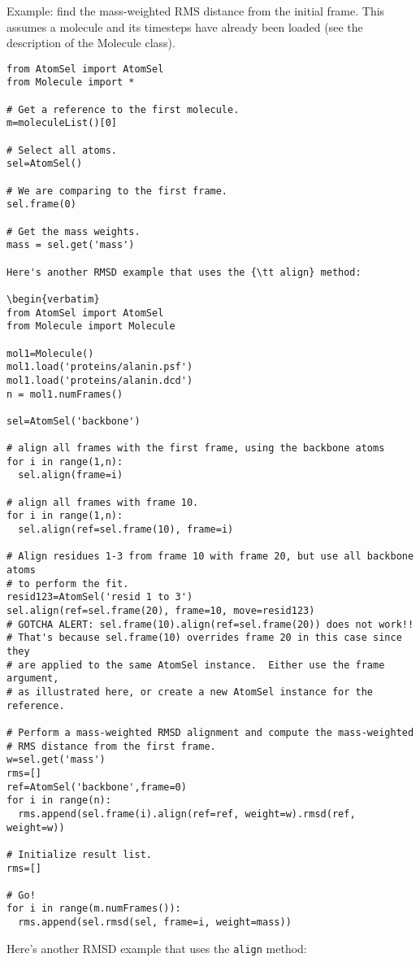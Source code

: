 Example: find the mass-weighted RMS distance from the initial frame.
This assumes a molecule and its timesteps have already been loaded
(see the description of the Molecule class).

\begin{verbatim}
from AtomSel import AtomSel
from Molecule import *

# Get a reference to the first molecule.
m=moleculeList()[0]

# Select all atoms.
sel=AtomSel()

# We are comparing to the first frame.
sel.frame(0)

# Get the mass weights.
mass = sel.get('mass')

Here's another RMSD example that uses the {\tt align} method:

\begin{verbatim}
from AtomSel import AtomSel
from Molecule import Molecule

mol1=Molecule()
mol1.load('proteins/alanin.psf')
mol1.load('proteins/alanin.dcd')
n = mol1.numFrames()

sel=AtomSel('backbone')

# align all frames with the first frame, using the backbone atoms
for i in range(1,n):
  sel.align(frame=i)

# align all frames with frame 10.
for i in range(1,n):
  sel.align(ref=sel.frame(10), frame=i)

# Align residues 1-3 from frame 10 with frame 20, but use all backbone atoms
# to perform the fit.
resid123=AtomSel('resid 1 to 3')
sel.align(ref=sel.frame(20), frame=10, move=resid123)
# GOTCHA ALERT: sel.frame(10).align(ref=sel.frame(20)) does not work!!
# That's because sel.frame(10) overrides frame 20 in this case since they
# are applied to the same AtomSel instance.  Either use the frame argument,
# as illustrated here, or create a new AtomSel instance for the reference.

# Perform a mass-weighted RMSD alignment and compute the mass-weighted 
# RMS distance from the first frame.
w=sel.get('mass')
rms=[]
ref=AtomSel('backbone',frame=0)
for i in range(n):
  rms.append(sel.frame(i).align(ref=ref, weight=w).rmsd(ref, weight=w))

# Initialize result list.
rms=[]

# Go!
for i in range(m.numFrames()):
  rms.append(sel.rmsd(sel, frame=i, weight=mass))
\end{verbatim}

Here's another RMSD example that uses the {\tt align} method:

